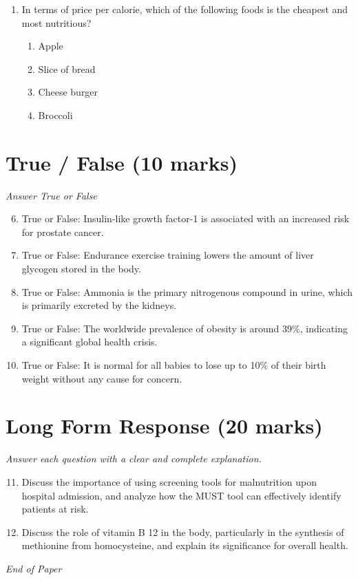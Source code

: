\documentclass[12pt]{article}
\begin{document}
\begin{enumerate}[label=\arabic*.]
\begin{enumerate}[label=(\alph*)]
    \item \textgreater{} 95\%
    \item \textless{} 50\%
\end{enumerate}
\item In terms of price per calorie, which of the following foods is the cheapest and most nutritious?
\begin{enumerate}[label=(\alph*)]
    \item Apple
    \item Slice of bread
    \item Cheese burger
    \item Broccoli
\end{enumerate}
\end{enumerate}

\section*{True / False (10 marks)}
\textit{Answer True or False}
\begin{enumerate}[label=\arabic*.]
\setcounter{enumi}{5}
\item True or False: Insulin-like growth factor-1 is associated with an increased risk for prostate cancer.
\item True or False: Endurance exercise training lowers the amount of liver glycogen stored in the body.
\item True or False: Ammonia is the primary nitrogenous compound in urine, which is primarily excreted by the kidneys.
\item True or False: The worldwide prevalence of obesity is around 39\%, indicating a significant global health crisis.
\item True or False: It is normal for all babies to lose up to 10\% of their birth weight without any cause for concern.
\end{enumerate}

\section*{Long Form Response (20 marks)}
\textit{Answer each question with a clear and complete explanation.}
\begin{enumerate}[label=\arabic*.]
\setcounter{enumi}{10}
\item Discuss the importance of using screening tools for malnutrition upon hospital admission, and analyze how the MUST tool can effectively identify patients at risk.
\item Discuss the role of vitamin B 12 in the body, particularly in the synthesis of methionine from homocysteine, and explain its significance for overall health.
\end{enumerate}

\vfill
\noindent\textit{End of Paper}
\end{document}

